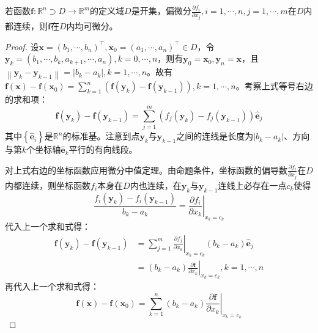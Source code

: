 \documentclass[main.tex]{subfiles}
\begin{document}
\begin{theorem}
若函数$\mathbf{f}:\mathbb{R}^n\supset D\rightarrow\mathbb{R}^m$的定义域$D$是开集，偏微分$\frac{\partial f_i}{\partial x_j},i=1,\cdots,n,j=1,\cdots,m$在$D$内都连续，则$\mathbf{f}$在$D$内均可微分。
\end{theorem}
\begin{proof}
设$\mathbf{x}=\left(b_1,\cdots,b_n\right)^\intercal,\mathbf{x}_0=\left(a_1,\cdots,a_n\right)^\intercal\in D$，令$\mathbf{y}_k=\left(b_1,\cdots,b_k,a_{k+1},\cdots,a_n\right),k=0,\cdots,n$，则有$\mathbf{y}_0=\mathbf{x}_0,\mathbf{y}_n=\mathbf{x}$，且$\left\|\mathbf{y}_k-\mathbf{y}_{k-1}\right\|=\left|b_k-a_k\right|,k=1,\cdots,n$。故有$\mathbf{f}\left(\mathbf{x}\right)-\mathbf{f}\left(\mathbf{x}_0\right)=\sum_{k=1}^n\left(\mathbf{f}\left(\mathbf{y}_k\right)-\mathbf{f}\left(\mathbf{y}_{k-1}\right)\right),k=1,\cdots,n$。考察上式等号右边的求和项：
\[\mathbf{f}\left(\mathbf{y}_k\right)-\mathbf{f}\left(\mathbf{y}_{k-1}\right)=\sum_{j=1}^m\left(f_j\left(\mathbf{y}_k\right)-f_j\left(\mathbf{y}_{k-1}\right)\right)\mathbf{\hat{e}}_j
\]
其中$\left\{\mathbf{\hat{e}}_i\right\}$是$\mathbb{R}^n$的标准基。注意到点$\mathbf{y}_k$与$\mathbf{y}_{k-1}$之间的连线是长度为$\left|b_k-a_k\right|$、方向与第$k$个坐标轴$\mathbf{\hat{e}}_k$平行的有向线段。

对上式右边的坐标函数应用微分中值定理。由命题条件，坐标函数的偏导数$\frac{\partial f_i}{\partial x_j}$在$D$内都连续，则坐标函数$f_i$本身在$D$内也连续，在$\mathbf{y}_k$与$\mathbf{y}_{k-1}$连线上必存在一点$c_k$使得
\[\frac{f_i\left(\mathbf{y}_k\right)-f_i\left(\mathbf{y}_{k-1}\right)}{b_k-a_k}=\left.\frac{\partial f_i}{\partial x_k}\right|_{x_k=c_k}\]
代入上一个求和式得：
\begin{align*}
\mathbf{f}\left(\mathbf{y}_k\right)-\mathbf{f}\left(\mathbf{y}_{k-1}\right)&=\sum_{j=1}^m\left.\frac{\partial f_j}{\partial x_k}\right|_{x_k=c_k}\left(b_k-a_k\right)\mathbf{\hat{e}}_j\\
&=\left(b_k-a_k\right)\left.\frac{\partial \mathbf{f}}{\partial x_k}\right|_{x_k=c_k},k=1,\cdots,n
\end{align*}
再代入上一个求和式得：
\[\mathbf{f}\left(\mathbf{x}\right)-\mathbf{f}\left(\mathbf{x}_0\right)=\sum_{k=1}^n\left(b_k-a_k\right)\left.\frac{\partial \mathbf{f}}{\partial x_k}\right|_{x_k=c_k}
\]


\end{proof}
\end{document}
